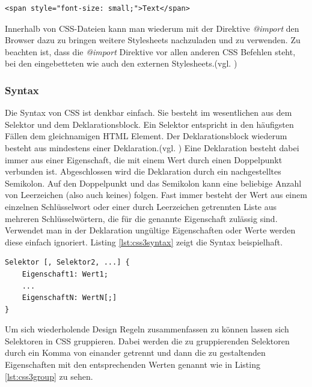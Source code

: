 	\vspace{1em}
	\lstset{language=html}
	\begin{lstlisting}[frame=htrbl, caption=Stylesheet Einbindung in \textit{html}-Element, label=lst:css3einbindunghtml]
<span style="font-size: small;">Text</span>
	\end{lstlisting}
	
Innerhalb von CSS-Dateien kann man wiederum mit der Direktive \textit{@import} den Browser dazu zu bringen weitere Stylesheets nachzuladen und zu verwenden. Zu beachten ist, dass die \textit{@import} Direktive vor allen anderen CSS Befehlen steht, bei den eingebetteten wie auch den externen Stylesheets.(vgl. \cite[S.20]{MeyeCasc2005})

\subsubsection{Syntax} Die Syntax von CSS ist denkbar einfach. Sie besteht im wesentlichen aus dem Selektor und dem Deklarationsblock. Ein Selektor entspricht in den häufigsten Fällen dem gleichnamigen HTML Element. Der Deklarationsblock wiederum besteht aus mindestens einer Deklaration.(vgl. \cite[S.26]{MeyeCasc2005}) \glqq Eine Deklaration besteht dabei immer aus einer Eigenschaft, die mit einem Wert durch einen Doppelpunkt verbunden ist. Abgeschlossen wird die Deklaration durch ein nachgestelltes Semikolon. Auf den Doppelpunkt und das Semikolon kann eine beliebige Anzahl von Leerzeichen (also auch keines) folgen. Fast immer besteht der Wert aus einem einzelnen Schlüsselwort oder einer durch Leerzeichen getrennten Liste aus mehreren Schlüsselwörtern, die für die genannte Eigenschaft zulässig sind.\grqq{}\cite[S.28]{MeyeCasc2005} Verwendet man in der Deklaration ungültige Eigenschaften oder Werte werden diese einfach ignoriert. Listing \ref{lst:css3syntax} zeigt die Syntax beispielhaft.

	\vspace{1em}
	\begin{lstlisting}[frame=htrbl, caption=CSS3 Syntax Beispiel, label=lst:css3syntax]
Selektor [, Selektor2, ...] {
    Eigenschaft1: Wert1;
    ...
    EigenschaftN: WertN[;]
}
	\end{lstlisting}

Um sich wiederholende Design Regeln zusammenfassen zu können lassen sich Selektoren in CSS gruppieren. Dabei werden die zu gruppierenden Selektoren durch ein Komma von einander getrennt und dann die zu gestaltenden Eigenschaften mit den entsprechenden Werten genannt wie in Listing \ref{lst:css3group} zu sehen.

